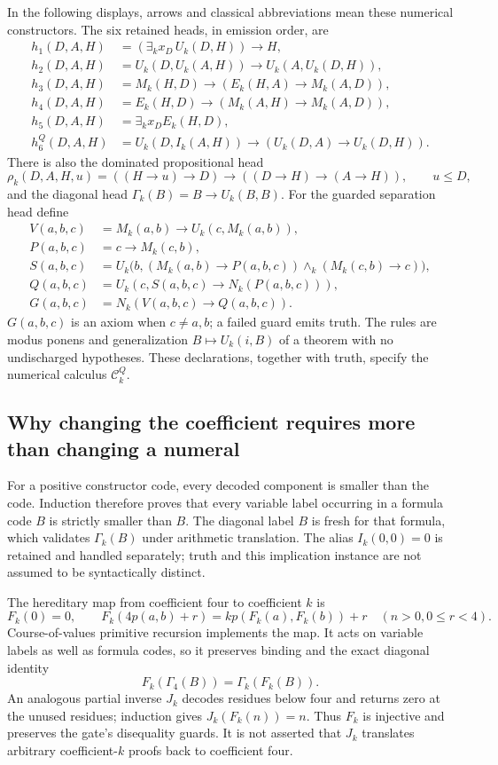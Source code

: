 \documentclass[11pt,letterpaper]{article}
\begin{document}
In the following displays, arrows and classical abbreviations mean these
numerical constructors. The six retained heads, in emission order, are
\begin{align*}
 h_1(D,A,H)&=(\exists_k x_D\,U_k(D,H))\to H,\\
 h_2(D,A,H)&=U_k(D,U_k(A,H))\to U_k(A,U_k(D,H)),\\
 h_3(D,A,H)&=M_k(H,D)\to(E_k(H,A)\to M_k(A,D)),\\
 h_4(D,A,H)&=E_k(H,D)\to(M_k(A,H)\to M_k(A,D)),\\
 h_5(D,A,H)&=\exists_k x_D E_k(H,D),\\
 h_6^Q(D,A,H)&=U_k(D,I_k(A,H))\to(U_k(D,A)\to U_k(D,H)).
\end{align*}
There is also the dominated propositional head
\[
 \rho_k(D,A,H,u)=((H\to u)\to D)\to((D\to H)\to(A\to H)),
 \qquad u\le D,
\]
and the diagonal head $\Gamma_k(B)=B\to U_k(B,B)$.
For the guarded separation head define
\begin{align*}
 V(a,b,c)&=M_k(a,b)\to U_k(c,M_k(a,b)),\\
 P(a,b,c)&=c\to M_k(c,b),\\
 S(a,b,c)&=U_k\bigl(b,(M_k(a,b)\to P(a,b,c))
                         \wedge_k(M_k(c,b)\to c)\bigr),\\
 Q(a,b,c)&=U_k(c,S(a,b,c)\to N_k(P(a,b,c))),\\
 G(a,b,c)&=N_k(V(a,b,c)\to Q(a,b,c)).
\end{align*}
$G(a,b,c)$ is an axiom when $c\ne a,b$; a failed guard emits truth.
The rules are modus ponens and generalization $B\mapsto U_k(i,B)$ of a theorem
with no undischarged hypotheses. These declarations, together with truth,
specify the numerical calculus $\mathcal C_k^Q$.

\subsection{Why changing the coefficient requires more than changing a numeral}

For a positive constructor code, every decoded component is smaller than the
code. Induction therefore proves that every variable label occurring in a
formula code $B$ is strictly smaller than $B$. The diagonal label $B$ is fresh
for that formula, which validates $\Gamma_k(B)$ under arithmetic translation.
The alias $I_k(0,0)=0$ is retained and handled separately; truth and this
implication instance are not assumed to be syntactically distinct.

The hereditary map from coefficient four to coefficient $k$ is
\[
 F_k(0)=0,\qquad
 F_k(4p(a,b)+r)=kp(F_k(a),F_k(b))+r\quad(n>0, 0\le r<4).
\]
Course-of-values primitive recursion implements the map. It acts on variable
labels as well as formula codes, so it preserves binding and the exact diagonal
identity
\[
 F_k(\Gamma_4(B))=\Gamma_k(F_k(B)).
\]
An analogous partial inverse $J_k$ decodes residues below four and returns zero
at the unused residues; induction gives $J_k(F_k(n))=n$. Thus $F_k$ is injective
and preserves the gate's disequality guards. It is not asserted that $J_k$
translates arbitrary coefficient-$k$ proofs back to coefficient four.
\end{document}
